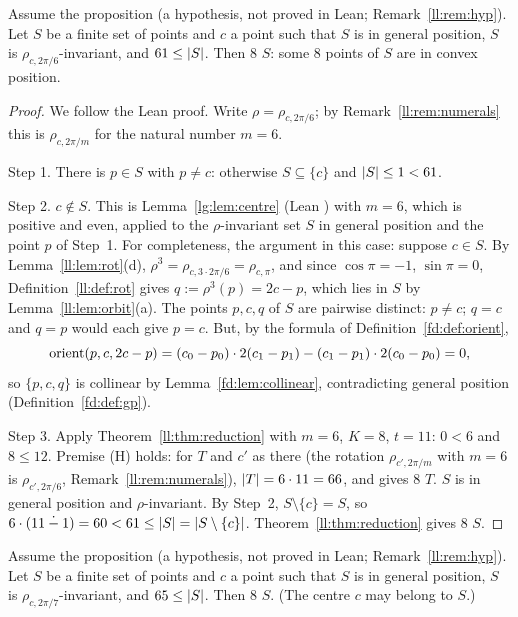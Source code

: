 \begin{theorem}\label{ll:thm:sixfold}
Assume the proposition  (a hypothesis, not proved in Lean; Remark~\ref{ll:rem:hyp}). Let $S$ be a finite
set of points and $c$ a point such that $S$ is in general position, $S$ is $\rho_{c,2\pi/6}$-invariant, and
$61\le\lvert S\rvert$. Then  $8$ $S$: some $8$ points of $S$ are in convex position.
\end{theorem}

\begin{proof}
We follow the Lean proof. Write $\rho=\rho_{c,2\pi/6}$; by Remark~\ref{ll:rem:numerals} this is $\rho_{c,2\pi/m}$ for the
natural number $m=6$.

Step 1. There is $p\in S$ with $p\ne c$: otherwise $S\subseteq\{c\}$ and $\lvert S\rvert\le1<61$.

Step 2. $c\notin S$. This is Lemma~\ref{lg:lem:centre} (Lean ) with $m=6$, which is
positive and even, applied to the $\rho$-invariant set $S$ in general position and the point $p$ of Step~1. For
completeness, the argument in this case: suppose $c\in S$. By Lemma~\ref{ll:lem:rot}(d),
$\rho^3=\rho_{c,3\cdot2\pi/6}=\rho_{c,\pi}$, and since $\cos\pi=-1$, $\sin\pi=0$, Definition~\ref{ll:def:rot} gives
$q:=\rho^3(p)=2c-p$, which lies in $S$ by Lemma~\ref{ll:lem:orbit}(a). The points $p,c,q$ of $S$ are pairwise distinct:
$p\ne c$; $q=c$ and $q=p$ would each give $p=c$. But, by the formula of Definition~\ref{fd:def:orient},
\[\operatorname{orient}(p,c,2c-p)=(c_0-p_0)\cdot2(c_1-p_1)-(c_1-p_1)\cdot2(c_0-p_0)=0,\]
so $\{p,c,q\}$ is collinear by Lemma~\ref{fd:lem:collinear}, contradicting general position
(Definition~\ref{fd:def:gp}).

Step 3. Apply Theorem~\ref{ll:thm:reduction} with $m=6$, $K=8$, $t=11$: $0<6$ and $8\le12$. Premise (H) holds: for $T$
and $c'$ as there (the rotation $\rho_{c',2\pi/m}$ with $m=6$ is $\rho_{c',2\pi/6}$, Remark~\ref{ll:rem:numerals}),
$\lvert T\rvert=6\cdot11=66$, and  gives  $8$ $T$. $S$ is in general
position and $\rho$-invariant. By Step~2, $S\setminus\{c\}=S$, so $6\cdot(11\mathbin{\dot{-}}1)=60<61\le\lvert S\rvert
=\lvert S\setminus\{c\}\rvert$. Theorem~\ref{ll:thm:reduction} gives  $8$ $S$.
\end{proof}

\begin{theorem}\label{ll:thm:sevenfold}
Assume the proposition  (a hypothesis, not proved in Lean; Remark~\ref{ll:rem:hyp}). Let $S$ be a
finite set of points and $c$ a point such that $S$ is in general position, $S$ is $\rho_{c,2\pi/7}$-invariant, and
$65\le\lvert S\rvert$. Then  $8$ $S$. (The centre $c$ may belong to $S$.)
\end{theorem}


